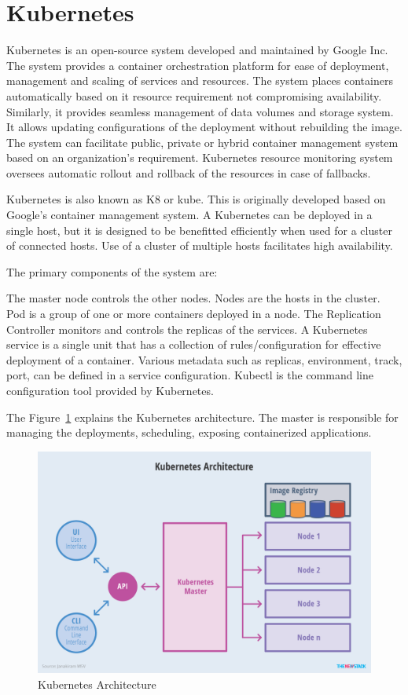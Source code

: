 \section{Kubernetes}

Kubernetes is an open-source system developed and maintained by Google Inc.
The system provides a container orchestration platform for ease of deployment,
management and scaling of services and resources. The system places containers
automatically based on it resource requirement not compromising availability.
Similarly, it provides seamless management of data volumes and storage system.
It allows updating configurations of the deployment without rebuilding the
image. The system can facilitate public, private or hybrid container
management system based on an organization's requirement.  Kubernetes resource
monitoring system oversees automatic rollout and rollback of the resources in
case of fallbacks.


Kubernetes is also known as K8 or kube. This is originally developed based on
Google's container management system. A Kubernetes can be deployed in a single
host, but it is designed to be benefitted efficiently when used for a cluster
of connected hosts. Use of a cluster of multiple hosts facilitates high
availability.


The primary components of the system are: 

The master node controls the other nodes. Nodes are the hosts in the cluster.
Pod is a group of one or more containers deployed in a node. The Replication
Controller monitors and controls the replicas of the services. A Kubernetes
service is a single unit that has a collection of rules/configuration for
effective deployment of a container. Various metadata such as replicas,
environment, track, port, can be defined in a service configuration.  Kubectl
is the command line configuration tool provided by Kubernetes.

The Figure~\ref{fig:kube-archtecture} explains the Kubernetes architecture.
The master is responsible for managing the deployments, scheduling, exposing
containerized applications.

\begin{figure}[htb]
	\centering\includegraphics[width=\columnwidth]{images/hid_417_Kubernetes-Architecture.png}
  \caption{Kubernetes Architecture~\cite{hid-sp18-417-kubernetes}}
  \label{fig:kube-archtecture}
\end{figure}


